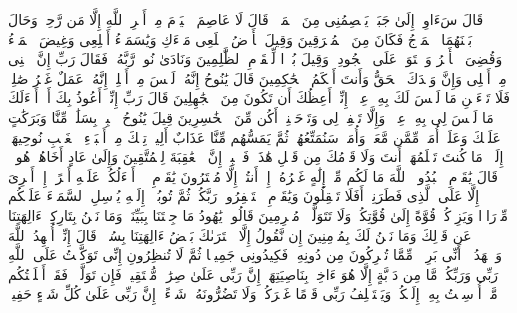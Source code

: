 \stopbuffer%
\startbuffer[\q:11:43]
قَالَ سَءَاوِیۤ إِلَىٰ جَبَلࣲ یَعۡصِمُنِی مِنَ ٱلۡمَاۤءِۚ قَالَ لَا عَاصِمَ ٱلۡیَوۡمَ مِنۡ أَمۡرِ ٱللَّهِ إِلَّا مَن رَّحِمَۚ وَحَالَ بَیۡنَهُمَا ٱلۡمَوۡجُ فَكَانَ مِنَ ٱلۡمُغۡرَقِینَ%
\stopbuffer%
\startbuffer[\q:11:44]
وَقِیلَ یَٰۤأَرۡضُ ٱبۡلَعِی مَاۤءَكِ وَیَٰسَمَاۤءُ أَقۡلِعِی وَغِیضَ ٱلۡمَاۤءُ وَقُضِیَ ٱلۡأَمۡرُ وَٱسۡتَوَتۡ عَلَى ٱلۡجُودِیِّۖ وَقِیلَ بُعۡدࣰا لِّلۡقَوۡمِ ٱلظَّٰلِمِینَ%
\stopbuffer%
\startbuffer[\q:11:45]
وَنَادَىٰ نُوحࣱ رَّبَّهُۥ فَقَالَ رَبِّ إِنَّ ٱبۡنِی مِنۡ أَهۡلِی وَإِنَّ وَعۡدَكَ ٱلۡحَقُّ وَأَنتَ أَحۡكَمُ ٱلۡحَٰكِمِینَ%
\stopbuffer%
\startbuffer[\q:11:46]
قَالَ یَٰنُوحُ إِنَّهُۥ لَیۡسَ مِنۡ أَهۡلِكَۖ إِنَّهُۥ عَمَلٌ غَیۡرُ صَٰلِحࣲۖ فَلَا تَسۡءَلۡنِ مَا لَیۡسَ لَكَ بِهِۦ عِلۡمٌۖ إِنِّیۤ أَعِظُكَ أَن تَكُونَ مِنَ ٱلۡجَٰهِلِینَ%
\stopbuffer%
\startbuffer[\q:11:47]
قَالَ رَبِّ إِنِّیۤ أَعُوذُ بِكَ أَنۡ أَسۡءَلَكَ مَا لَیۡسَ لِی بِهِۦ عِلۡمࣱۖ وَإِلَّا تَغۡفِرۡ لِی وَتَرۡحَمۡنِیۤ أَكُن مِّنَ ٱلۡخَٰسِرِینَ%
\stopbuffer%
\startbuffer[\q:11:48]
قِیلَ یَٰنُوحُ ٱهۡبِطۡ بِسَلَٰمࣲ مِّنَّا وَبَرَكَٰتٍ عَلَیۡكَ وَعَلَىٰۤ أُمَمࣲ مِّمَّن مَّعَكَۚ وَأُمَمࣱ سَنُمَتِّعُهُمۡ ثُمَّ یَمَسُّهُم مِّنَّا عَذَابٌ أَلِیمࣱ%
\stopbuffer%
\startbuffer[\q:11:49]
تِلۡكَ مِنۡ أَنۢبَاۤءِ ٱلۡغَیۡبِ نُوحِیهَاۤ إِلَیۡكَۖ مَا كُنتَ تَعۡلَمُهَاۤ أَنتَ وَلَا قَوۡمُكَ مِن قَبۡلِ هَٰذَاۖ فَٱصۡبِرۡۖ إِنَّ ٱلۡعَٰقِبَةَ لِلۡمُتَّقِینَ%
\stopbuffer%
\startbuffer[\q:11:50]
وَإِلَىٰ عَادٍ أَخَاهُمۡ هُودࣰاۚ قَالَ یَٰقَوۡمِ ٱعۡبُدُوا۟ ٱللَّهَ مَا لَكُم مِّنۡ إِلَٰهٍ غَیۡرُهُۥۤۖ إِنۡ أَنتُمۡ إِلَّا مُفۡتَرُونَ%
\stopbuffer%
\startbuffer[\q:11:51]
یَٰقَوۡمِ لَاۤ أَسۡءَلُكُمۡ عَلَیۡهِ أَجۡرًاۖ إِنۡ أَجۡرِیَ إِلَّا عَلَى ٱلَّذِی فَطَرَنِیۤۚ أَفَلَا تَعۡقِلُونَ%
\stopbuffer%
\startbuffer[\q:11:52]
وَیَٰقَوۡمِ ٱسۡتَغۡفِرُوا۟ رَبَّكُمۡ ثُمَّ تُوبُوۤا۟ إِلَیۡهِ یُرۡسِلِ ٱلسَّمَاۤءَ عَلَیۡكُم مِّدۡرَارࣰا وَیَزِدۡكُمۡ قُوَّةً إِلَىٰ قُوَّتِكُمۡ وَلَا تَتَوَلَّوۡا۟ مُجۡرِمِینَ%
\stopbuffer%
\startbuffer[\q:11:53]
قَالُوا۟ یَٰهُودُ مَا جِئۡتَنَا بِبَیِّنَةࣲ وَمَا نَحۡنُ بِتَارِكِیۤ ءَالِهَتِنَا عَن قَوۡلِكَ وَمَا نَحۡنُ لَكَ بِمُؤۡمِنِینَ%
\stopbuffer%
\startbuffer[\q:11:54]
إِن نَّقُولُ إِلَّا ٱعۡتَرَىٰكَ بَعۡضُ ءَالِهَتِنَا بِسُوۤءࣲۗ قَالَ إِنِّیۤ أُشۡهِدُ ٱللَّهَ وَٱشۡهَدُوۤا۟ أَنِّی بَرِیۤءࣱ مِّمَّا تُشۡرِكُونَ%
\stopbuffer%
\startbuffer[\q:11:55]
مِن دُونِهِۦۖ فَكِیدُونِی جَمِیعࣰا ثُمَّ لَا تُنظِرُونِ%
\stopbuffer%
\startbuffer[\q:11:56]
إِنِّی تَوَكَّلۡتُ عَلَى ٱللَّهِ رَبِّی وَرَبِّكُمۚ مَّا مِن دَاۤبَّةٍ إِلَّا هُوَ ءَاخِذُۢ بِنَاصِیَتِهَاۤۚ إِنَّ رَبِّی عَلَىٰ صِرَٰطࣲ مُّسۡتَقِیمࣲ%
\stopbuffer%
\startbuffer[\q:11:57]
فَإِن تَوَلَّوۡا۟ فَقَدۡ أَبۡلَغۡتُكُم مَّاۤ أُرۡسِلۡتُ بِهِۦۤ إِلَیۡكُمۡۚ وَیَسۡتَخۡلِفُ رَبِّی قَوۡمًا غَیۡرَكُمۡ وَلَا تَضُرُّونَهُۥ شَیۡءًاۚ إِنَّ رَبِّی عَلَىٰ كُلِّ شَیۡءٍ حَفِیظࣱ%
